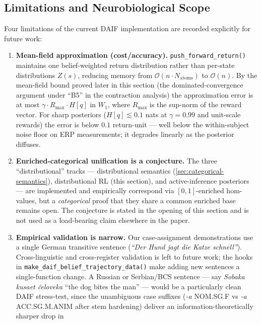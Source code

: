 \documentclass[
]{article}
\begin{document}
\subsection{Limitations and Neurobiological
Scope}\label{sec:daif-limitations}

Four limitations of the current DAIF implementation are recorded
explicitly for future work:

\begin{enumerate}
\def\labelenumi{\arabic{enumi}.}
\item
  \textbf{Mean-field approximation (cost/accuracy).}
  \texttt{push\_forward\_return()} maintains one belief-weighted return
  distribution rather than per-state distributions \(Z(s)\), reducing
  memory from \(\mathcal{O}(n\cdot N_{\text{atoms}})\) to
  \(\mathcal{O}(n)\). By the mean-field bound proved later in this
  section (the dominated-convergence argument under ``B5'' in the
  contraction analysis) the approximation error is at most
  \(\gamma\cdot R_{\max}\cdot H[q]\) in \(W_1\), where \(R_{\max}\) is
  the sup-norm of the reward vector. For sharp posteriors
  (\(H[q]\lesssim 0.1\) nats at \(\gamma=0.99\) and unit-scale rewards)
  the error is below \(0.1\) return-unit --- well below the
  within-subject noise floor on ERP measurements; it degrades linearly
  as the posterior diffuses.
\item
  \textbf{Enriched-categorical unification is a conjecture.} The three
  ``distributional'' tracks --- distributional semantics
  (\autoref{sec:categorical-semantics}), distributional RL (this
  section), and active-inference posteriors --- are implemented and
  empirically correspond via \([0,1]\)-enriched hom-values, but a
  \emph{categorical} proof that they share a common enriched base
  remains open. The conjecture is stated in the opening of this section
  and is not used as a load-bearing claim elsewhere in the paper.
\item
  \textbf{Empirical validation is narrow.} Our case-assignment
  demonstrations use a single German transitive sentence (\emph{``Der
  Hund jagt die Katze schnell''}). Cross-linguistic and cross-register
  validation is left to future work; the hooks in
  \texttt{make\_daif\_belief\_trajectory\_data()} make adding new
  sentences a single-function change. A Russian or Serbian/BCS sentence
  --- say \emph{Sobaka kusaet čeloveka} ``the dog bites the man'' ---
  would be a particularly clean DAIF stress-test, since the unambiguous
  case suffixes (\emph{-a} NOM.SG.F vs \emph{-a} ACC.SG.M.ANIM after
  stem hardening) deliver an information-theoretically sharper drop in

\end{enumerate}
\end{document}
